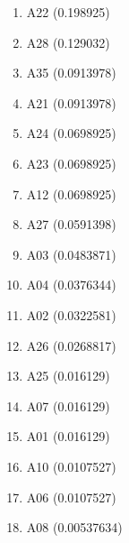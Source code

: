\begin{enumerate}
\item A22 (0.198925)
\item A28 (0.129032)
\item A35 (0.0913978)
\item A21 (0.0913978)
\item A24 (0.0698925)
\item A23 (0.0698925)
\item A12 (0.0698925)
\item A27 (0.0591398)
\item A03 (0.0483871)
\item A04 (0.0376344)
\item A02 (0.0322581)
\item A26 (0.0268817)
\item A25 (0.016129)
\item A07 (0.016129)
\item A01 (0.016129)
\item A10 (0.0107527)
\item A06 (0.0107527)
\item A08 (0.00537634)
\end{enumerate}